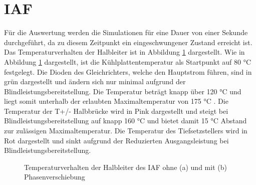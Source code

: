 \section{IAF}
Für die Auswertung werden die Simulationen für eine Dauer von einer Sekunde durchgeführt, da zu diesem Zeitpunkt ein eingeschwungener Zustand erreicht ist. Das Temperaturverhalten der Halbleiter ist in Abbildung \ref{fig:iaftemp} dargestellt. Wie in Abbildung \ref{fig:iaftemp} dargestellt, ist die Kühlplattentemperatur als Startpunkt auf 80 °C festgelegt. Die Dioden des Gleichrichters, welche den Hauptstrom führen, sind in grün dargestellt und ändern sich nur minimal aufgrund der Blindleistungsbereitstellung. Die Temperatur beträgt knapp über 120 °C und liegt somit unterhalb der erlaubten Maximaltemperatur von 175 °C \cite{IFAGFF2}. Die Temperatur der T+/- Halbbrücke wird in Pink dargestellt und steigt bei Blindleistungsbereitstellung auf knapp 160 °C und bietet damit 15 °C Abstand zur zulässigen Maximaltemperatur. Die Temperatur des Tiefsetzstellers wird in Rot dargestellt und sinkt aufgrund der Reduzierten Ausgangsleistung bei Blindleistungsbereitstellung.  
\begin{figure}
	\centering
	\qquad
	\caption{Temperaturverhalten der Halbleiter des IAF ohne (a) und mit (b) Phasenverschiebung}
	\label{fig:iaftemp}
\end{figure}

